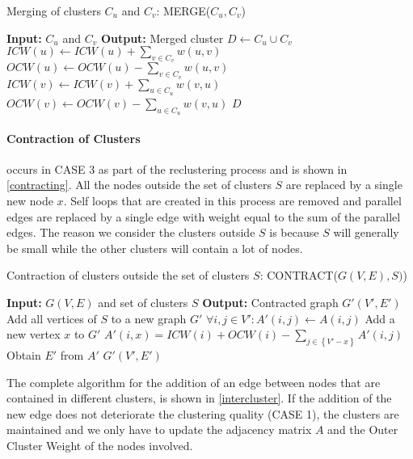 \begin{algorithm}
\caption{Merging of clusters $C_u$ and $C_v$: MERGE($C_u,C_v$)}
\label{merging}
\begin{algorithmic}
\STATE \textbf{Input:} $C_u$ and $C_v$ 
\STATE \textbf{Output:} Merged cluster
\STATE $D \leftarrow C_u \cup C_v$
	\STATE $ICW(u) \leftarrow ICW(u) + \sum_{v \in C_v}{w(u,v)}$
	\STATE $OCW(u) \leftarrow OCW(u) - \sum_{v \in C_v}{w(u,v)}$
\ENDFOR
{}
	\STATE $ICW(v) \leftarrow ICW(v) + \sum_{u \in C_u}{w(v,u)}$
	\STATE $OCW(v) \leftarrow OCW(v) - \sum_{u \in C_u}{w(v,u)}$
\ENDFOR
\RETURN $D$
\end{algorithmic}
\end{algorithm}

\paragraph{Contraction of Clusters} occurs in CASE 3 as part of the reclustering process and is shown in \autoref{contracting}. All the nodes outside the set of clusters $S$ are replaced by a single new node $x$. Self loops that are created in this process are removed and parallel edges are replaced by a single edge with weight equal to the sum of the parallel edges. The reason we consider the clusters outside $S$ is because $S$ will generally be small while the other clusters will contain a lot of nodes.

\begin{algorithm}
\caption{Contraction of clusters outside the set of clusters $S$: CONTRACT($G(V,E),S)$)}
\label{contracting}
\begin{algorithmic}
\STATE \textbf{Input:} $G(V,E)$ and set of clusters $S$ 
\STATE \textbf{Output:} Contracted graph $G'(V',E')$
\STATE Add all vertices of $S$ to a new graph $G'$
\STATE $\forall i,j \in V' : A'(i,j) \leftarrow A(i,j)$
\STATE Add a new vertex $x$ to $G'$
	\STATE $A'(i,x) = ICW(i) + OCW(i) - \sum_{j \in \left\{ V' - x \right\} }{A'(i,j)}$
\ENDFOR
\STATE Obtain $E'$ from $A'$
\RETURN $G'(V',E')$
\end{algorithmic}
\end{algorithm}

The complete algorithm for the addition of an edge between nodes that are contained in different clusters, is shown in \autoref{intercluster}. If the addition of the new edge does not deteriorate the clustering quality (CASE 1), the clusters are maintained and we only have to update the adjacency matrix $A$ and the Outer Cluster Weight of the nodes involved. 


